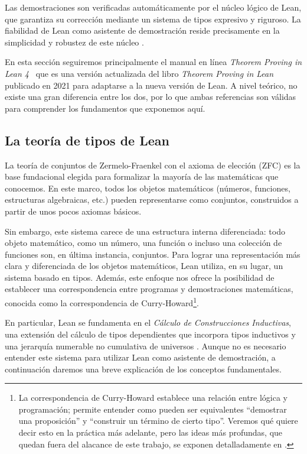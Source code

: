 \documentclass{article}
\newcommand{\quotes}[1]{``#1''}
\begin{document}
Las demostraciones son verificadas automáticamente por el núcleo lógico de Lean, que garantiza su corrección mediante un sistema de tipos expresivo y riguroso. La fiabilidad de Lean como asistente de demostración reside precisamente en la simplicidad y robustez de este núcleo \cite{bailey2024type}.

En esta sección seguiremos principalmente el manual en línea \textit{Theorem Proving in Lean 4}~\cite{avigad2024theorem} que es una versión actualizada del libro \textit{Theorem Proving in Lean}~\cite{avigad2021theorem} publicado en 2021 para adaptarse a la nueva versión de Lean. A nivel teórico, no existe una gran diferencia entre los dos, por lo que ambas referencias son válidas para comprender los fundamentos que exponemos aquí.


\subsection{La teoría de tipos de Lean}

La teoría de conjuntos de Zermelo-Fraenkel con el axioma de elección (ZFC) es la base fundacional elegida para formalizar la mayoría de las matemáticas que conocemos. En este marco, todos los objetos matemáticos (números, funciones, estructuras algebraicas, etc.) pueden representarse como conjuntos, construidos a partir de unos pocos axiomas básicos.

Sin embargo, este sistema carece de una estructura interna diferenciada: todo objeto matemático, como un número, una función o incluso una colección de funciones son, en última instancia, conjuntos. Para lograr una representación más clara y diferenciada de los objetos matemáticos, Lean utiliza, en su lugar, un sistema basado en tipos. Además, este enfoque nos ofrece la posibilidad de establecer una correspondencia entre programas y demostraciones matemáticas, conocida como la correspondencia de Curry-Howard\footnote{La correspondencia de Curry-Howard establece una relación entre lógica y programación; permite entender como pueden ser equivalentes \quotes{demostrar una proposición} y \quotes{construir un término de cierto tipo}. Veremos qué quiere decir esto en la práctica más adelante, pero las ideas más profundas, que quedan fuera del alacance de este trabajo, se exponen detalladamente en \cite{sorensen2006lectures}.}.

En particular, Lean se fundamenta en el \textit{Cálculo de Construcciones Inductivas}, una extensión del cálculo de tipos dependientes que incorpora tipos inductivos y una jerarquía numerable no cumulativa de universos \cite{coquand1986calculus}. Aunque no es necesario entender este sistema para utilizar Lean como asistente de demostración, a continuación daremos una breve explicación de los conceptos fundamentales.
\end{document}
